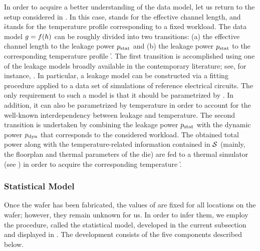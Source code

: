 In order to acquire a better understanding of the data model, let us return to
the setup considered in . In this case, \g stands for the
effective channel length, and \h stands for the temperature profile
corresponding to a fixed workload. The data model $g = f(h)$ can be roughly
divided into two transitions: (a) the effective channel length \g to the leakage
power $p_{\mathrm{stat}}$ and (b) the leakage power $p_{\mathrm{stat}}$ to the corresponding
temperature profile \h. The first transition is accomplished using one of the
leakage models broadly available in the contemporary literature; see, for
instance, \cite{chandrakasan2000, srivastava2010, juan2012}. In particular, a
leakage model can be constructed via a fitting procedure applied to a data set
of  simulations of reference electrical circuits. The only requirement
to such a model is that it should be parametrized by \g. In addition, it can
also be parametrized by temperature in order to account for the well-known
interdependency between leakage and temperature. The second transition is
undertaken by combining the leakage power $p_{\mathrm{stat}}$ with the dynamic power
$p_{\mathrm{dyn}}$ that corresponds to the considered workload. The obtained total
power along with the temperature-related information contained in $\mathcal{S}$
(mainly, the floorplan and thermal parameters of the die) are fed to a thermal
simulator (see ) in order to acquire the
corresponding temperature \h.

\subsubsection{Statistical Model}

Once the wafer has been fabricated, the values of \g are fixed for all
locations on the wafer; however, they remain unknown for us. In order to infer
them, we employ the procedure, called the statistical model, developed in the
current subsection and displayed in . The development consists
of the five components described below.

